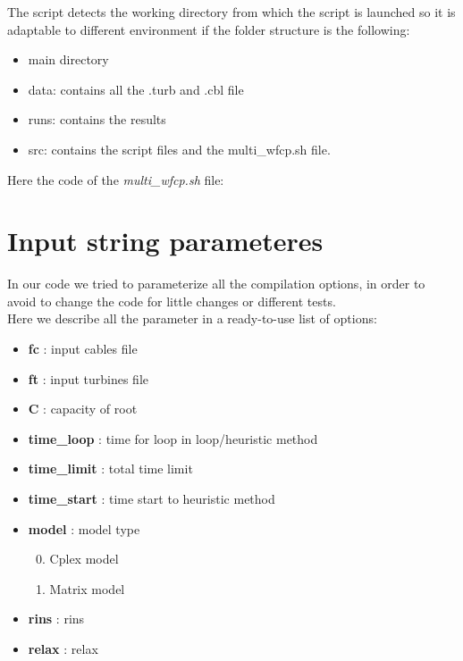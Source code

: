 \begin{appendices}
The script detects the working directory from which the script is launched so it is adaptable to different environment if the folder structure is the following:
\begin{itemize}
\item main directory
\item data: contains all the .turb and .cbl file
\item runs: contains the results 
\item src: contains the script files and the multi\_wfcp.sh file. 
\end{itemize}

Here the code of the \textit{multi\_wfcp.sh} file:
\newpage


\chapter{Input string parameteres}
In our code we tried to parameterize all the compilation options, in order to avoid to change the code for little changes or different tests. \\
Here we describe all the parameter in a ready-to-use list of options: 
\begin{itemize}
\setlength{\parskip}{0pt}
\setlength{\itemsep}{0.5pt plus 1pt}
\item \textbf{fc} : input cables file
\item \textbf{ft} : input turbines file
\item \textbf{C} : capacity of root
\item \textbf{time\_loop} : time for loop in loop/heuristic method
\item \textbf{time\_limit} : total time limit
\item \textbf{time\_start} : time start to heuristic method
\item \textbf{model} : model type
\begin{enumerate}\setcounter{enumi}{-1}
\setlength{\parskip}{0pt}
\setlength{\itemsep}{0pt plus 1pt}
	\item Cplex model
	\item Matrix model
\end{enumerate}
\item \textbf{rins} : rins
\item \textbf{relax} : relax
\begin{enumerate}\setcounter{enumi}{0}
\setlength{\parskip}{0pt}
\setlength{\itemsep}{0pt plus 1pt}

\end{enumerate}
\end{itemize}
\end{appendices}
